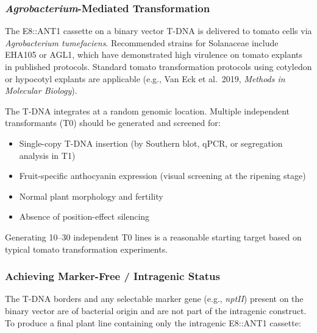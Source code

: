 \documentclass[12pt,a4paper]{article}
\begin{document}
\subsubsection{\textit{Agrobacterium}-Mediated Transformation}

The E8::ANT1 cassette on a binary vector T-DNA is delivered to tomato cells via \textit{Agrobacterium tumefaciens}. Recommended strains for Solanaceae include EHA105 or AGL1, which have demonstrated high virulence on tomato explants in published protocols. Standard tomato transformation protocols using cotyledon or hypocotyl explants are applicable (e.g., Van Eck et al.\ 2019, \textit{Methods in Molecular Biology}).

The T-DNA integrates at a random genomic location. Multiple independent transformants (T0) should be generated and screened for:
\begin{itemize}
  \item Single-copy T-DNA insertion (by Southern blot, qPCR, or segregation analysis in T1)
  \item Fruit-specific anthocyanin expression (visual screening at the ripening stage)
  \item Normal plant morphology and fertility
  \item Absence of position-effect silencing
\end{itemize}

Generating 10--30 independent T0 lines is a reasonable starting target based on typical tomato transformation experiments.

\subsubsection{Achieving Marker-Free / Intragenic Status}
\label{sec:markerfree}

The T-DNA borders and any selectable marker gene (e.g., \textit{nptII}) present on the binary vector are of bacterial origin and are not part of the intragenic construct. To produce a final plant line containing only the intragenic E8::ANT1 cassette:
\end{document}
